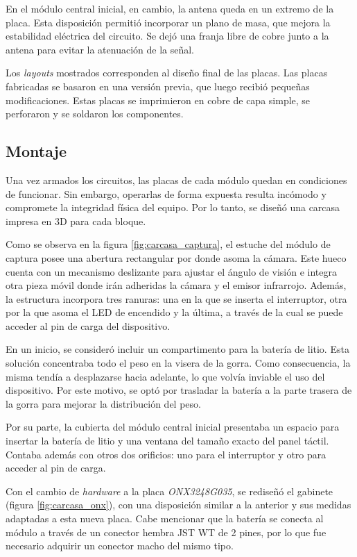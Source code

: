 En el módulo central inicial, en cambio, la antena queda en un extremo de la placa. Esta disposición permitió incorporar un plano de masa, que mejora la estabilidad eléctrica del circuito. Se dejó una franja libre de cobre junto a la antena para evitar la atenuación de la señal.

Los \emph{layouts} mostrados corresponden al diseño final de las placas. Las placas fabricadas se basaron en una versión previa, que luego recibió pequeñas modificaciones. Estas placas se imprimieron en cobre de capa simple, se perforaron y se soldaron los componentes.

\subsection{Montaje}


Una vez armados los circuitos, las placas de cada módulo quedan en condiciones de funcionar. Sin embargo, operarlas de forma expuesta resulta incómodo y compromete la integridad física del equipo. Por lo tanto, se diseñó una carcasa impresa en 3D para cada bloque.

Como se observa en la figura \ref{fig:carcasa_captura}, el estuche del módulo de captura posee una abertura rectangular por donde asoma la cámara. Este hueco cuenta con un mecanismo deslizante para ajustar el ángulo de visión e integra otra pieza móvil donde irán adheridas la cámara y el emisor infrarrojo. Además, la estructura incorpora tres ranuras: una en la que se inserta el interruptor, otra por la que asoma el LED de encendido y la última, a través de la cual se puede acceder al pin de carga del dispositivo.

En un inicio, se consideró incluir un compartimento para la batería de litio. Esta solución concentraba todo el peso en la visera de la gorra. Como consecuencia, la misma tendía a desplazarse hacia adelante, lo que volvía inviable el uso del dispositivo. Por este motivo, se optó por trasladar la batería a la parte trasera de la gorra para mejorar la distribución del peso.

Por su parte, la cubierta del módulo central inicial presentaba un espacio para insertar la batería de litio y una ventana del tamaño exacto del panel táctil. Contaba además con otros dos orificios: uno para el interruptor y otro para acceder al pin de carga. 

Con el cambio de \emph{hardware} a la placa \emph{ONX3248G035}, se rediseñó el gabinete (figura \ref{fig:carcasa_onx}), con una disposición similar a la anterior y sus medidas adaptadas a esta nueva placa. Cabe mencionar que la batería se conecta al módulo a través de un conector hembra JST WT de 2 pines, por lo que fue necesario adquirir un conector macho del mismo tipo.

